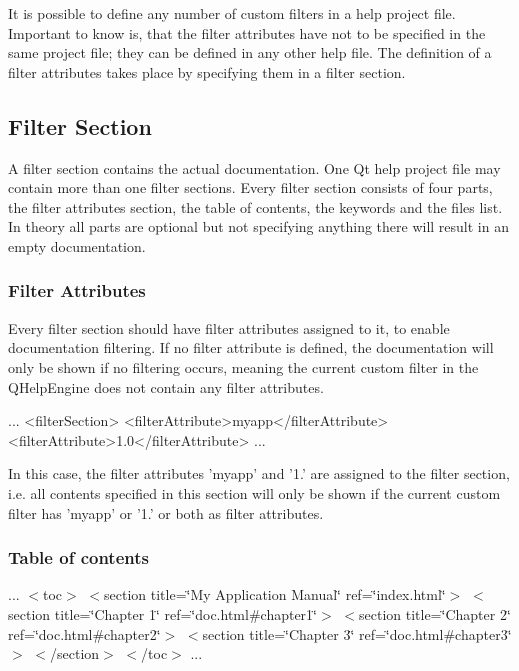 It is possible to define any number of custom filters in a help project file. Important to know is, that the filter attributes have not to be specified in the same project file; they can be defined in any other help file. The definition of a filter attributes takes place by specifying them in a filter section.\hypertarget{helpproject_hep_filtersection}{}\subsection{Filter Section}\label{helpproject_hep_filtersection}
A filter section contains the actual documentation. One Qt help project file may contain more than one filter sections. Every filter section consists of four parts, the filter attributes section, the table of contents, the keywords and the files list. In theory all parts are optional but not specifying anything there will result in an empty documentation.\hypertarget{helpproject_helpproject_filteratts}{}\subsubsection{Filter Attributes}\label{helpproject_helpproject_filteratts}
Every filter section should have filter attributes assigned to it, to enable documentation filtering. If no filter attribute is defined, the documentation will only be shown if no filtering occurs, meaning the current custom filter in the Q\-Help\-Engine does not contain any filter attributes. \begin{DoxyVerb}...
<filterSection>
    <filterAttribute>myapp</filterAttribute>
    <filterAttribute>1.0</filterAttribute>
...
\end{DoxyVerb}


In this case, the filter attributes 'myapp' and '1.' are assigned to the filter section, i.\-e. all contents specified in this section will only be shown if the current custom filter has 'myapp' or '1.' or both as filter attributes.\hypertarget{helpproject_helpproject_tableofcontets}{}\subsubsection{Table of contents}\label{helpproject_helpproject_tableofcontets}
... $<$toc$>$ $<$section title=\char`\"{}\-My Application Manual\char`\"{} ref=\char`\"{}index.\-html\char`\"{}$>$ $<$section title=\char`\"{}\-Chapter 1\char`\"{} ref=\char`\"{}doc.\-html\#chapter1\char`\"{}$>$ $<$section title=\char`\"{}\-Chapter 2\char`\"{} ref=\char`\"{}doc.\-html\#chapter2\char`\"{}$>$ $<$section title=\char`\"{}\-Chapter 3\char`\"{} ref=\char`\"{}doc.\-html\#chapter3\char`\"{}$>$ $<$/section$>$ $<$/toc$>$ ...

